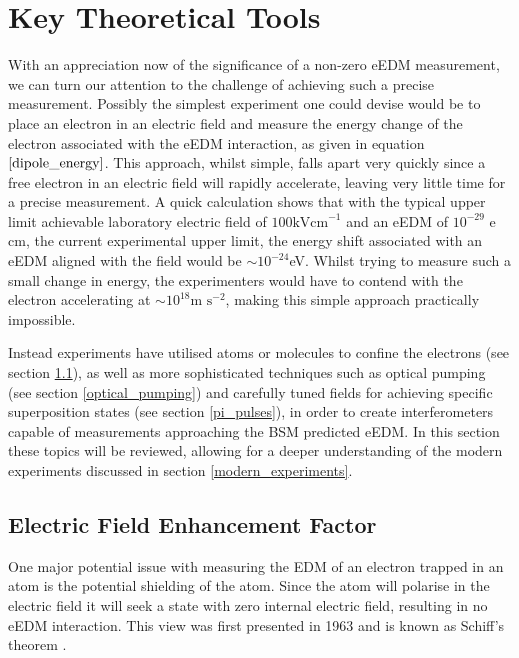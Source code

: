 \chapter{Key Theoretical Tools}
\label{theory}

With an appreciation now of the significance of a non-zero eEDM measurement, we can turn our attention to the challenge of achieving such a precise measurement. Possibly the simplest experiment one could devise would be to place an electron in an electric field and measure the energy change of the electron associated with the eEDM interaction, as given in equation $\ref{dipole_energy}$. This approach, whilst simple, falls apart very quickly since a free electron in an electric field will rapidly accelerate, leaving very little time for a precise measurement. A quick calculation shows that with the typical upper limit achievable laboratory electric field of $100 \text{kVcm}^{-1}$ and an eEDM of $10^{-29}$ e cm, the current experimental upper limit, the energy shift associated with an eEDM aligned with the field would be ${\sim}10^{-24} $eV. Whilst trying to measure such a small change in energy, the experimenters would have to contend with the electron accelerating at $\sim 10^{18} \text{m s}^{-2}$, making this simple approach practically impossible.

Instead experiments have utilised atoms or molecules to confine the electrons (see section \ref{enhancement_factor_section}), as well as more sophisticated techniques such as optical pumping (see section \ref{optical_pumping}) and carefully tuned fields for achieving specific superposition states (see section \ref{pi_pulses}), in order to create interferometers capable of measurements approaching the BSM predicted eEDM. In this section these topics will be reviewed, allowing for a deeper understanding of the modern experiments discussed in section \ref{modern_experiments}.

\section{Electric Field Enhancement Factor}
\label{enhancement_factor_section}

One major potential issue with measuring the EDM of an electron trapped in an atom is the potential shielding of the atom. Since the atom will polarise in the electric field it will seek a state with zero internal electric field, resulting in no eEDM interaction. This view was first presented in 1963 and is known as Schiff's theorem \cite{Schiff_1963}.

